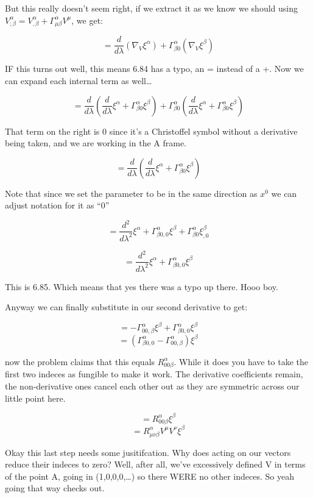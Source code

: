 \documentclass[landscape,letterpaper,10pt,english]{article}
\begin{document}
But this really doesn't seem right, if we extract it as we know we
should using
\(V^\alpha_{;\beta} = V^\alpha_{,\beta} + \Gamma^\alpha_{\mu\beta} V^\mu\),
we get:

\[ = \frac{d}{d\lambda}(\nabla_V \xi^\alpha) + \Gamma^\alpha_{\beta 0}(\nabla_V \xi^\beta) \]

IF this turns out well, this means 6.84 has a typo, an = instead of a +.
Now we can expand each internal term as well\ldots{}

\[ = \frac{d}{d\lambda}(\frac{d}{d\lambda} \xi^\alpha + \Gamma^\alpha_{\beta 0} \xi^\beta) + \Gamma^\alpha_{\beta 0}(\frac{d}{d\lambda} \xi^\alpha + \Gamma^\alpha_{\beta 0} \xi^\beta) \]

That term on the right is 0 since it's a Christoffel symbol without a
derivative being taken, and we are working in the A frame.

\[ = \frac{d}{d\lambda}(\frac{d}{d\lambda} \xi^\alpha + \Gamma^\alpha_{\beta 0} \xi^\beta)\]

Note that since we set the parameter to be in the same direction as
\(x^0\) we can adjust notation for it as ``0''

\[ = \frac{d^2}{d\lambda^2} \xi^\alpha + \Gamma^\alpha_{\beta 0,0} \xi^\beta + \Gamma^\alpha_{\beta 0} \xi^\beta_{,0} \]

\[ = \frac{d^2}{d\lambda^2} \xi^\alpha + \Gamma^\alpha_{\beta 0,0} \xi^\beta\]

This is 6.85. Which means that yes there was a typo up there. Hooo boy.

Anyway we can finally substitute in our second derivative to get:

\[ = -\Gamma^\alpha_{00,\beta} \xi^\beta + \Gamma^\alpha_{\beta 0,0} \xi^\beta\]
\[ = (\Gamma^\alpha_{\beta 0,0}-\Gamma^\alpha_{00,\beta}) \xi^\beta\]

    now the problem claims that this equals \(R^\alpha_{00\beta}\). While it
does you have to take the first two indeces as fungible to make it work.
The derivative coefficients remain, the non-derivative ones cancel each
other out as they are symmetric across our little point here.

\[ = R^\alpha_{00\beta} \xi^\beta\]
\[ = R^\alpha_{\mu\nu\beta} V^\mu V^\nu \xi^\beta\]

    Okay this last step needs some jusitifcation. Why does acting on our
vectors reduce their indeces to zero? Well, after all, we've excessively
defined V in terms of the point A, going in (1,0,0,0,\ldots) so there
WERE no other indeces. So yeah going that way checks out.
\end{document}
